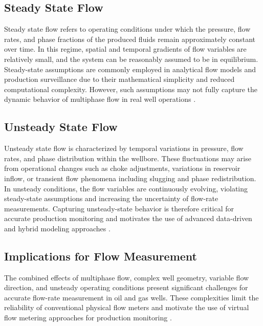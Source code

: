 \documentclass[12pt,APA]{uomthesis}
\begin{document}
\subsection{Steady State Flow}
Steady state flow refers to operating conditions under which the pressure, flow rates, and phase fractions of the produced fluids remain approximately constant over time. In this regime, spatial and temporal gradients of flow variables are relatively small, and the system can be reasonably assumed to be in equilibrium. Steady-state assumptions are commonly employed in analytical flow models and production surveillance due to their mathematical simplicity and reduced computational complexity. However, such assumptions may not fully capture the dynamic behavior of multiphase flow in real well operations \citep{shippen2012multiphase}.

\subsection{Unsteady State Flow}
Unsteady state flow is characterized by temporal variations in pressure, flow rates, and phase distribution within the wellbore. These fluctuations may arise from operational changes such as choke adjustments, variations in reservoir inflow, or transient flow phenomena including slugging and phase redistribution. In unsteady conditions, the flow variables are continuously evolving, violating steady-state assumptions and increasing the uncertainty of flow-rate measurements. Capturing unsteady-state behavior is therefore critical for accurate production monitoring and motivates the use of advanced data-driven and hybrid modeling approaches \citep{santim2020transient}.

\subsection{Implications for Flow Measurement}
The combined effects of multiphase flow, complex well geometry, variable flow direction, and unsteady operating conditions present significant challenges for accurate flow-rate measurement in oil and gas wells. These complexities limit the reliability of conventional physical flow meters and motivate the use of virtual flow metering approaches for production monitoring \citep{bikmukhametov2020first}.
\end{document}
